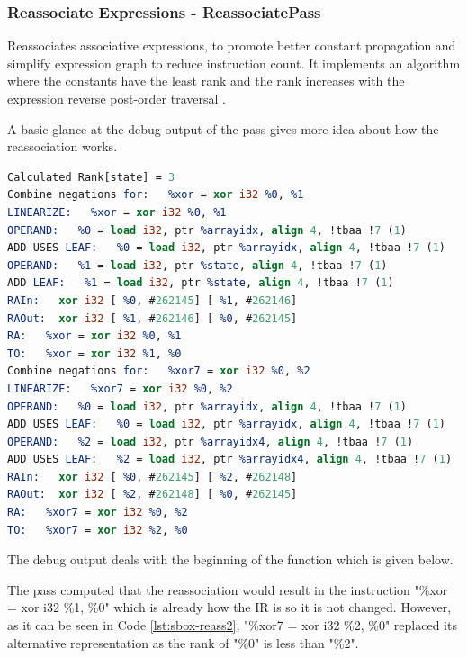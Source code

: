 \subsubsection{Reassociate Expressions - ReassociatePass}
Reassociates associative expressions, to promote better constant propagation and simplify expression graph to reduce instruction count. It implements an algorithm where the constants have the least rank and the rank increases with the expression reverse post-order traversal \cite{llvmcode-reassoc}. 





A basic glance at the debug output of the pass gives more idea about how the reassociation works.
\clearpage
\begin{lstlisting}[language=llvm, style=nasm, caption={Debug Output of Reassociate Pass from LLVM opt tool}]
Calculated Rank[state] = 3
Combine negations for:   %xor = xor i32 %0, %1
LINEARIZE:   %xor = xor i32 %0, %1
OPERAND:   %0 = load i32, ptr %arrayidx, align 4, !tbaa !7 (1)
ADD USES LEAF:   %0 = load i32, ptr %arrayidx, align 4, !tbaa !7 (1)
OPERAND:   %1 = load i32, ptr %state, align 4, !tbaa !7 (1)
ADD LEAF:   %1 = load i32, ptr %state, align 4, !tbaa !7 (1)
RAIn:	xor i32	[ %0, #262145] [ %1, #262146]
RAOut:	xor i32	[ %1, #262146] [ %0, #262145]
RA:   %xor = xor i32 %0, %1
TO:   %xor = xor i32 %1, %0
Combine negations for:   %xor7 = xor i32 %0, %2
LINEARIZE:   %xor7 = xor i32 %0, %2
OPERAND:   %0 = load i32, ptr %arrayidx, align 4, !tbaa !7 (1)
ADD USES LEAF:   %0 = load i32, ptr %arrayidx, align 4, !tbaa !7 (1)
OPERAND:   %2 = load i32, ptr %arrayidx4, align 4, !tbaa !7 (1)
ADD USES LEAF:   %2 = load i32, ptr %arrayidx4, align 4, !tbaa !7 (1)
RAIn:	xor i32	[ %0, #262145] [ %2, #262148]
RAOut:	xor i32	[ %2, #262148] [ %0, #262145]
RA:   %xor7 = xor i32 %0, %2
TO:   %xor7 = xor i32 %2, %0
\end{lstlisting}

The debug output deals with the beginning of the function which is given below.



The pass computed that the reassociation would result in the instruction "\%xor = xor i32 \%1, \%0" which is already how the IR is so it is not changed. However, as it can be seen in Code \ref{lst:sbox-reass2}, "\%xor7 = xor i32 \%2, \%0" replaced its alternative representation as the rank of "\%0" is less than "\%2". 


